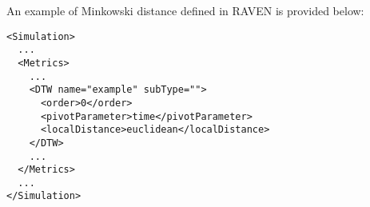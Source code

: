 An example of Minkowski distance defined in RAVEN is provided below:
\begin{lstlisting}[style=XML]
<Simulation> 
  ...
  <Metrics>
    ...
    <DTW name="example" subType="">
      <order>0</order>
      <pivotParameter>time</pivotParameter>
      <localDistance>euclidean</localDistance>
    </DTW>
    ...
  </Metrics>
  ...
</Simulation>
\end{lstlisting}
